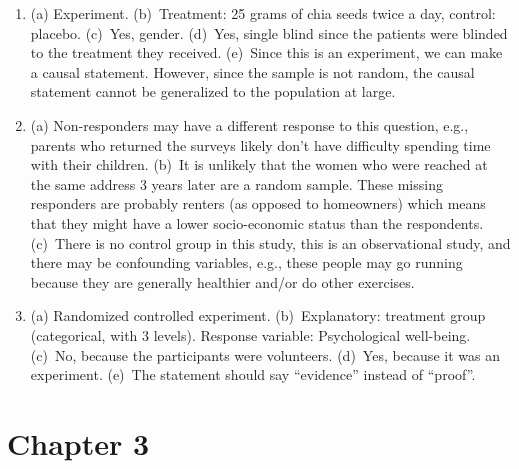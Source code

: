 \documentclass[
  10pt,
  openany]{book}
\begin{document}
\begin{enumerate}
  \addtocounter{enumi}{1}
\item
  (a) Experiment. (b)~Treatment: 25 grams of chia seeds twice a day, control: placebo. (c)~Yes, gender. (d)~Yes, single blind since the patients were blinded to the treatment they received. (e)~Since this is an experiment, we can make a causal statement. However, since the sample is not random, the causal statement cannot be generalized to the population at large.

  \addtocounter{enumi}{1}
\item
  (a) Non-responders may have a different response to this question, e.g., parents who returned the surveys likely don't have difficulty spending time with their children. (b)~It is unlikely that the women who were reached at the same address 3 years later are a random sample. These missing responders are probably renters (as opposed to homeowners) which means that they might have a lower socio-economic status than the respondents. (c)~There is no control group in this study, this is an observational study, and there may be confounding variables, e.g., these people may go running because they are generally healthier and/or do other exercises.

  \addtocounter{enumi}{1}
\item
  (a) Randomized controlled experiment. (b)~Explanatory: treatment group (categorical, with 3 levels). Response variable: Psychological well-being. (c)~No, because the participants were volunteers. (d)~Yes, because it was an experiment. (e)~The statement should say ``evidence'' instead of ``proof''.

  \addtocounter{enumi}{1}
\end{enumerate}

\hypertarget{exercise-solutions-04}{%
\section{Chapter 3}\label{exercise-solutions-04}}
\end{document}
